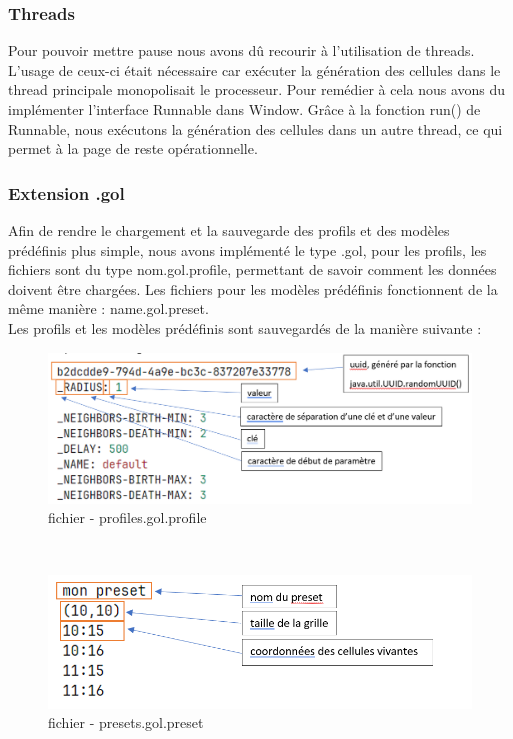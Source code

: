 \documentclass[12pt]{article}
\begin{document}
			\subsubsection{Threads}
			Pour pouvoir mettre pause nous avons dû recourir à l'utilisation de threads. L'usage de ceux-ci était nécessaire car exécuter la génération des cellules dans 
			le thread principale monopolisait le processeur. Pour remédier à cela nous avons du implémenter l'interface Runnable dans Window. 
			Grâce à la fonction run() de Runnable, nous exécutons la génération des cellules dans un autre thread, ce qui permet à la page de reste opérationnelle. 
			
			\subsubsection{Extension .gol} \label{config}
			Afin de rendre le chargement et la sauvegarde des profils et des modèles prédéfinis plus simple, nous avons implémenté le type .gol, pour les profils, 
			les fichiers sont du type nom.gol.profile, permettant de savoir comment les données doivent être chargées. 
			Les fichiers pour les modèles prédéfinis fonctionnent de la même manière : name.gol.preset.\\
			
			Les profils et les modèles prédéfinis sont sauvegardés de la manière suivante :
			\begin{figure}[!ht]
				\centering
				\includegraphics[width=\textwidth]{images/profiles.png}
				\caption{fichier - profiles.gol.profile}
			\end{figure}\\
			\begin{figure}[!ht]
				\centering
				\includegraphics[width=\textwidth]{images/presets.png}
				\caption{fichier - presets.gol.preset}
			\end{figure}
			
\end{document}
